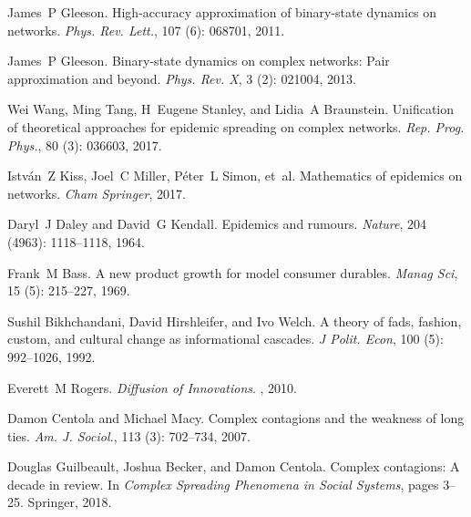 James~P Gleeson.
\newblock High-accuracy approximation of binary-state dynamics on networks.
\newblock \emph{Phys. Rev. Lett.}, 107 (6): 068701, 2011.

James~P Gleeson.
\newblock Binary-state dynamics on complex networks: {{Pair}} approximation and
beyond.
\newblock \emph{Phys. Rev. X}, 3 (2): 021004, 2013.

Wei Wang, Ming Tang, H~Eugene Stanley, and Lidia~A Braunstein.
\newblock Unification of theoretical approaches for epidemic spreading on
complex networks.
\newblock \emph{Rep. Prog. Phys.}, 80 (3): 036603, 2017.

Istv{\'a}n~Z Kiss, Joel~C Miller, P{\'e}ter~L Simon, et~al.
\newblock Mathematics of epidemics on networks.
\newblock \emph{Cham Springer}, 2017.

Daryl~J Daley and David~G Kendall.
\newblock Epidemics and rumours.
\newblock \emph{Nature}, 204 (4963): 1118--1118, 1964.

Frank~M Bass.
\newblock A new product growth for model consumer durables.
\newblock \emph{Manag Sci}, 15 (5): 215--227, 1969.

Sushil Bikhchandani, David Hirshleifer, and Ivo Welch.
\newblock A theory of fads, fashion, custom, and cultural change as
informational cascades.
\newblock \emph{J Polit. Econ}, 100 (5): 992--1026, 1992.

Everett~M Rogers.
\newblock \emph{Diffusion of Innovations}.
, 2010.

Damon Centola and Michael Macy.
\newblock Complex contagions and the weakness of long ties.
\newblock \emph{Am. J. Sociol.}, 113 (3): 702--734, 2007.

Douglas Guilbeault, Joshua Becker, and Damon Centola.
\newblock Complex contagions: {{A}} decade in review.
\newblock In \emph{Complex Spreading Phenomena in Social Systems}, pages 3--25.
{Springer}, 2018.


